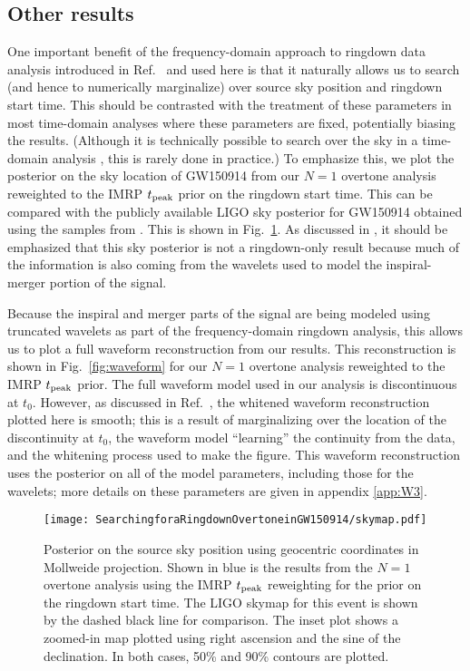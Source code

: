 \subsection{Other results} \label{subsec:other_results}

One important benefit of the frequency-domain approach to ringdown data analysis introduced in Ref.~\cite{Finch:2021qph} and used here is that it naturally allows us to search (and hence to numerically marginalize) over source sky position and ringdown start time. 
This should be contrasted with the treatment of these parameters in most time-domain analyses where these parameters are fixed, potentially biasing the results. (Although it is technically possible to search over the sky in a time-domain analysis \cite{Carullo:2019flw, Isi:2021iql}, this is rarely done in practice.)
To emphasize this, we plot the posterior on the sky location of GW150914 from our $N=1$ overtone analysis reweighted to the IMRP $t_{\rm peak}$ prior on the ringdown start time.
This can be compared with the publicly available LIGO sky posterior for GW150914 obtained using the samples from \cite{skysamples}.
This is shown in Fig.~\ref{fig:skymap}.
As discussed in \cite{Finch:2021qph}, it should be emphasized that this sky posterior is not a ringdown-only result because much of the information is also coming from the wavelets used to model the inspiral-merger portion of the signal.

Because the inspiral and merger parts of the signal are being modeled using truncated wavelets as part of the frequency-domain ringdown analysis, this allows us to plot a full waveform reconstruction from our results.
This reconstruction is shown in Fig.~\ref{fig:waveform} for our $N=1$ overtone analysis reweighted to the IMRP $t_{\rm peak}$ prior.
The full waveform model used in our analysis is discontinuous at $t_0$. However, as discussed in Ref.~\cite{Finch:2021qph}, the whitened waveform reconstruction plotted here is smooth; this is a result of marginalizing over the location of the discontinuity at $t_0$, the waveform model ``learning'' the continuity from the data, and the whitening process used to make the figure.
This waveform reconstruction uses the posterior on all of the model parameters, including those for the wavelets; more details on these parameters are given in appendix \ref{app:W3}.

\begin{figure}[t]
	\texttt{[image: SearchingforaRingdownOvertoneinGW150914/skymap.pdf]}
	\caption[Posterior on the GW150914 source sky position]{ 
		Posterior on the source sky position using geocentric coordinates in Mollweide projection.
		Shown in blue is the results from the $N=1$ overtone analysis using the IMRP $t_{\rm peak}$ reweighting for the prior on the ringdown start time.
		The LIGO skymap for this event is shown by the dashed black line for comparison.
		The inset plot shows a zoomed-in map plotted using right ascension and the sine of the declination.
		In both cases, 50\% and 90\% contours are plotted.
	}
	\label{fig:skymap}
\end{figure}

